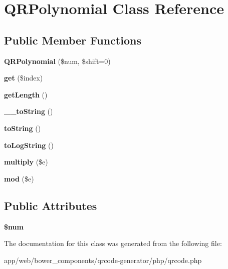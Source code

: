 \hypertarget{class_q_r_polynomial}{}\section{Q\+R\+Polynomial Class Reference}
\label{class_q_r_polynomial}
\subsection*{Public Member Functions}
\begin{DoxyCompactItemize}
\item 
\mbox{\label{class_q_r_polynomial_a188ce5f3611e69f65e3218af93b63fe1}} 
{\bfseries Q\+R\+Polynomial} (\$num, \$shift=0)
\item 
\mbox{\label{class_q_r_polynomial_ad36fbcc3eea6d5d56a876d9c4f71ab24}} 
{\bfseries get} (\$index)
\item 
\mbox{\label{class_q_r_polynomial_a26b912ac2bdd9feea7fb84c8537a3090}} 
{\bfseries get\+Length} ()
\item 
\mbox{\label{class_q_r_polynomial_a3048ba145effc26be8912f971f2be5f7}} 
{\bfseries \+\_\+\+\_\+to\+String} ()
\item 
\mbox{\label{class_q_r_polynomial_adb378f713c6c4828d23eb19a0d2ec8ad}} 
{\bfseries to\+String} ()
\item 
\mbox{\label{class_q_r_polynomial_ac79a05227d8ae3a5b4c10f304153d3a9}} 
{\bfseries to\+Log\+String} ()
\item 
\mbox{\label{class_q_r_polynomial_a34f325f5ce8a137e311ce29f44c4eddb}} 
{\bfseries multiply} (\$e)
\item 
\mbox{\label{class_q_r_polynomial_acdc16795a65d2c6a54dfdb98b0c9cf61}} 
{\bfseries mod} (\$e)
\end{DoxyCompactItemize}
\subsection*{Public Attributes}
\begin{DoxyCompactItemize}
\item 
\mbox{\label{class_q_r_polynomial_a15b6867f00b730258559d734c5819a8d}} 
{\bfseries \$num}
\end{DoxyCompactItemize}


The documentation for this class was generated from the following file\+:\begin{DoxyCompactItemize}
\item 
app/web/bower\+\_\+components/qrcode-\/generator/php/qrcode.\+php\end{DoxyCompactItemize}
